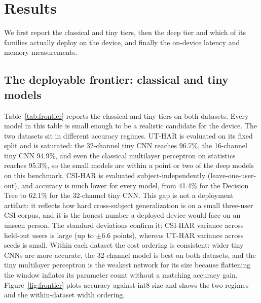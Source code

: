 \documentclass{ieeeaccess}
\begin{document}
\section{Results}
\label{sec:results}
We first report the classical and tiny tiers, then the deep tier and which of its families actually deploy on the device, and finally the on-device latency and memory measurements.

\subsection{The deployable frontier: classical and tiny models}
\label{sec:results-frontier}
Table~\ref{tab:frontier} reports the classical and tiny tiers on both datasets. Every model in this table is small enough to be a realistic candidate for the device. The two datasets sit in different accuracy regimes. UT-HAR is evaluated on its fixed split and is saturated: the 32-channel tiny CNN reaches 96.7\%, the 16-channel tiny CNN 94.9\%, and even the classical multilayer perceptron on statistics reaches 95.3\%, so the small models are within a point or two of the deep models on this benchmark. CSI-HAR is evaluated subject-independently (leave-one-user-out), and accuracy is much lower for every model, from 41.4\% for the Decision Tree to 62.1\% for the 32-channel tiny CNN. This gap is not a deployment artifact: it reflects how hard cross-subject generalization is on a small three-user CSI corpus, and it is the honest number a deployed device would face on an unseen person. The standard deviations confirm it: CSI-HAR variance across held-out users is large (up to $\pm$6.6 points), whereas UT-HAR variance across seeds is small. Within each dataset the cost ordering is consistent: wider tiny CNNs are more accurate, the 32-channel model is best on both datasets, and the tiny multilayer perceptron is the weakest network for its size because flattening the window inflates its parameter count without a matching accuracy gain. Figure~\ref{fig:frontier} plots accuracy against int8 size and shows the two regimes and the within-dataset width ordering.
\end{document}
